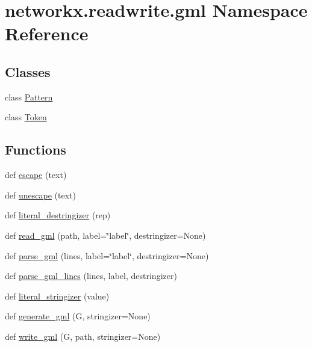 \hypertarget{namespacenetworkx_1_1readwrite_1_1gml}{}\section{networkx.\+readwrite.\+gml Namespace Reference}
\label{namespacenetworkx_1_1readwrite_1_1gml}
\subsection*{Classes}
\begin{DoxyCompactItemize}
\item 
class \hyperlink{classnetworkx_1_1readwrite_1_1gml_1_1Pattern}{Pattern}
\item 
class \hyperlink{classnetworkx_1_1readwrite_1_1gml_1_1Token}{Token}
\end{DoxyCompactItemize}
\subsection*{Functions}
\begin{DoxyCompactItemize}
\item 
def \hyperlink{namespacenetworkx_1_1readwrite_1_1gml_ab4086423cbcc357eb5887d685b019c57}{escape} (text)
\item 
def \hyperlink{namespacenetworkx_1_1readwrite_1_1gml_a9907ffa3702dcdddef892b199993d612}{unescape} (text)
\item 
def \hyperlink{namespacenetworkx_1_1readwrite_1_1gml_a333bb415789b52c5a1309d059827841f}{literal\+\_\+destringizer} (rep)
\item 
def \hyperlink{namespacenetworkx_1_1readwrite_1_1gml_aba571a8a92b3ebcce57b824d466821b6}{read\+\_\+gml} (path, label=\char`\"{}label\char`\"{}, destringizer=None)
\item 
def \hyperlink{namespacenetworkx_1_1readwrite_1_1gml_a322e0dbedf276e06fd8c60b8cbfb1494}{parse\+\_\+gml} (lines, label=\char`\"{}label\char`\"{}, destringizer=None)
\item 
def \hyperlink{namespacenetworkx_1_1readwrite_1_1gml_a2be87cb4d9130d4b78fc03880374741e}{parse\+\_\+gml\+\_\+lines} (lines, label, destringizer)
\item 
def \hyperlink{namespacenetworkx_1_1readwrite_1_1gml_aea3dfde117c2087e1ddd2c8f37c0bb27}{literal\+\_\+stringizer} (value)
\item 
def \hyperlink{namespacenetworkx_1_1readwrite_1_1gml_a7212443bc0093c077bcba29a564434d9}{generate\+\_\+gml} (G, stringizer=None)
\item 
def \hyperlink{namespacenetworkx_1_1readwrite_1_1gml_ad43015e77f44b01748f1943fadda2c3e}{write\+\_\+gml} (G, path, stringizer=None)
\end{DoxyCompactItemize}
